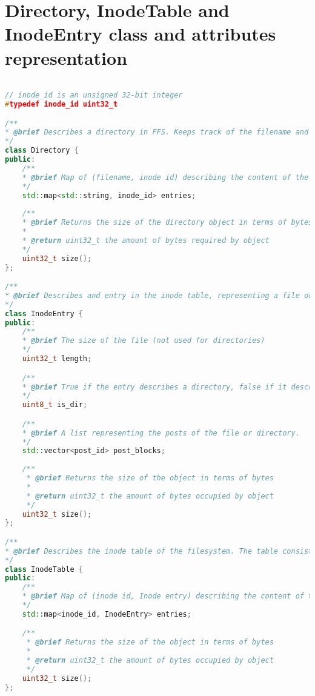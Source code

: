 \renewcommand{\chaptermark}[1]{\markboth{Appendix \thechapter\relax:\thinspace\relax#1}{}}
\chapter{Directory, InodeTable and InodeEntry class and attributes representation}
\label{app:inode_dir_code}
\begin{lstlisting}[language=c++, caption={The attributes classes representing directories and the inode table in FFS}, label=lst:dir_itable_classes,breaklines=true]

// inode_id is an unsigned 32-bit integer
#typedef inode_id uint32_t

/**
* @brief Describes a directory in FFS. Keeps track of the filename and inode of each file
*/
class Directory {
public:
	/**
	* @brief Map of (filename, inode id) describing the content of the directory
	*/
	std::map<std::string, inode_id> entries;
	
	/**
	* @brief Returns the size of the directory object in terms of bytes
	* 
	* @return uint32_t the amount of bytes required by object
	*/
	uint32_t size();
};

/**
* @brief Describes and entry in the inode table, representing a file or directory
*/
class InodeEntry {
public:
	/**
	* @brief The size of the file (not used for directories) 
	*/
	uint32_t length;

	/**
	* @brief True if the entry describes a directory, false if it describes a file
	*/
	uint8_t is_dir;

	/**
	* @brief A list representing the posts of the file or directory. 
	*/
	std::vector<post_id> post_blocks;
	
	/**
	 * @brief Returns the size of the object in terms of bytes
	 * 
	 * @return uint32_t the amount of bytes occupied by object
	 */
	uint32_t size();
};

/**
* @brief Describes the inode table of the filesystem. The table consists of multiple inode entries
*/
class InodeTable {
public:
	/**
	* @brief Map of (inode id, Inode entry) describing the content of the inode table
	*/
	std::map<inode_id, InodeEntry> entries;

	/**
	 * @brief Returns the size of the object in terms of bytes
	 * 
	 * @return uint32_t the amount of bytes occupied by object
	 */
	uint32_t size();
};

\end{lstlisting}